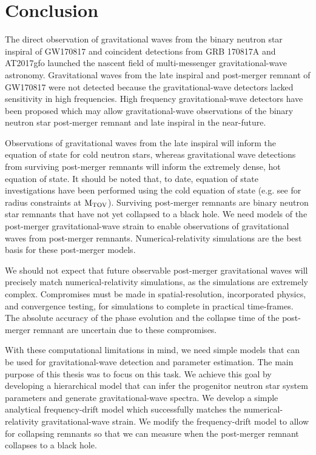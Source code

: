 \documentclass[../Thesis.tex]{subfiles}
\begin{document}
\chapter{Conclusion}\label{chapter:Conclusion}
    The direct observation of gravitational waves from the binary neutron star inspiral of GW170817 and coincident detections from GRB 170817A and AT2017gfo launched the nascent field of multi-messenger gravitational-wave astronomy.
    Gravitational waves from the late inspiral and post-merger remnant of GW170817 were not detected because the gravitational-wave detectors lacked sensitivity in high frequencies.
    High frequency gravitational-wave detectors have been proposed  which may allow gravitational-wave observations of the binary neutron star post-merger remnant and late inspiral in the near-future. \par
    
    Observations of gravitational waves from the late inspiral will inform the equation of state for cold neutron stars, whereas gravitational wave detections from surviving post-merger remnants will inform the extremely dense, hot equation of state. It should be noted that, to date, equation of state investigations have been performed using the cold equation of state (e.g. see \cite{Bauswein2014,Breschi2019} for radius constraints at $\mathrm{M_{TOV}}$). 
    Surviving post-merger remnants are binary neutron star remnants that have not yet collapsed to a black hole.
    We need models of the post-merger gravitational-wave strain to enable observations of gravitational waves from post-merger remnants.
    Numerical-relativity simulations are the best basis for these post-merger models. \par
    
    We should not expect that future observable post-merger gravitational waves will precisely match numerical-relativity simulations, as the simulations are extremely complex.
    Compromises must be made in spatial-resolution, incorporated physics, and convergence testing, for simulations to complete in practical time-frames.
    The absolute accuracy of the phase evolution and the collapse time of the post-merger remnant are uncertain due to these compromises.\par
    
    With these computational limitations in mind, we need simple models that can be used for gravitational-wave detection and parameter estimation.
    The main purpose of this thesis was to focus on this task.
    We achieve this goal by developing a hierarchical model that can infer the progenitor neutron star system parameters and generate gravitational-wave spectra.
    We develop a simple analytical frequency-drift model which successfully matches the numerical-relativity gravitational-wave strain. 
    We modify the frequency-drift model to allow for collapsing remnants so that we can measure when the post-merger remnant collapses to a black hole.
    
\end{document}
